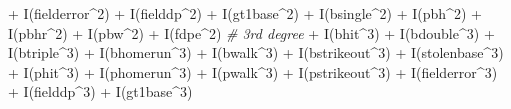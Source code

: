\documentclass[
]{article}
\newenvironment{Shaded}{\begin{snugshade}}{\end{snugshade}}
\newcommand{\CommentTok}[1]{\textcolor[rgb]{0.56,0.35,0.01}{\textit{#1}}}
\newcommand{\DecValTok}[1]{\textcolor[rgb]{0.00,0.00,0.81}{#1}}
\newcommand{\FunctionTok}[1]{\textcolor[rgb]{0.00,0.00,0.00}{#1}}
\newcommand{\NormalTok}[1]{#1}
\newcommand{\SpecialCharTok}[1]{\textcolor[rgb]{0.00,0.00,0.00}{#1}}
\begin{document}
\begin{Shaded}
\begin{Highlighting}[]
               \SpecialCharTok{+} \FunctionTok{I}\NormalTok{(fielderror}\SpecialCharTok{\^{}}\DecValTok{2}\NormalTok{) }
               \SpecialCharTok{+} \FunctionTok{I}\NormalTok{(fielddp}\SpecialCharTok{\^{}}\DecValTok{2}\NormalTok{) }
               \SpecialCharTok{+} \FunctionTok{I}\NormalTok{(gt1base}\SpecialCharTok{\^{}}\DecValTok{2}\NormalTok{) }
               \SpecialCharTok{+} \FunctionTok{I}\NormalTok{(bsingle}\SpecialCharTok{\^{}}\DecValTok{2}\NormalTok{) }
               \SpecialCharTok{+} \FunctionTok{I}\NormalTok{(pbh}\SpecialCharTok{\^{}}\DecValTok{2}\NormalTok{) }
               \SpecialCharTok{+} \FunctionTok{I}\NormalTok{(pbhr}\SpecialCharTok{\^{}}\DecValTok{2}\NormalTok{) }
               \SpecialCharTok{+} \FunctionTok{I}\NormalTok{(pbw}\SpecialCharTok{\^{}}\DecValTok{2}\NormalTok{) }
               \SpecialCharTok{+} \FunctionTok{I}\NormalTok{(fdpe}\SpecialCharTok{\^{}}\DecValTok{2}\NormalTok{) }
               \CommentTok{\# 3rd degree}
               \SpecialCharTok{+} \FunctionTok{I}\NormalTok{(bhit}\SpecialCharTok{\^{}}\DecValTok{3}\NormalTok{)}
               \SpecialCharTok{+} \FunctionTok{I}\NormalTok{(bdouble}\SpecialCharTok{\^{}}\DecValTok{3}\NormalTok{) }
               \SpecialCharTok{+} \FunctionTok{I}\NormalTok{(btriple}\SpecialCharTok{\^{}}\DecValTok{3}\NormalTok{) }
               \SpecialCharTok{+} \FunctionTok{I}\NormalTok{(bhomerun}\SpecialCharTok{\^{}}\DecValTok{3}\NormalTok{) }
               \SpecialCharTok{+} \FunctionTok{I}\NormalTok{(bwalk}\SpecialCharTok{\^{}}\DecValTok{3}\NormalTok{) }
               \SpecialCharTok{+} \FunctionTok{I}\NormalTok{(bstrikeout}\SpecialCharTok{\^{}}\DecValTok{3}\NormalTok{) }
               \SpecialCharTok{+} \FunctionTok{I}\NormalTok{(stolenbase}\SpecialCharTok{\^{}}\DecValTok{3}\NormalTok{) }
               \SpecialCharTok{+} \FunctionTok{I}\NormalTok{(phit}\SpecialCharTok{\^{}}\DecValTok{3}\NormalTok{) }
               \SpecialCharTok{+} \FunctionTok{I}\NormalTok{(phomerun}\SpecialCharTok{\^{}}\DecValTok{3}\NormalTok{) }
               \SpecialCharTok{+} \FunctionTok{I}\NormalTok{(pwalk}\SpecialCharTok{\^{}}\DecValTok{3}\NormalTok{) }
               \SpecialCharTok{+} \FunctionTok{I}\NormalTok{(pstrikeout}\SpecialCharTok{\^{}}\DecValTok{3}\NormalTok{) }
               \SpecialCharTok{+} \FunctionTok{I}\NormalTok{(fielderror}\SpecialCharTok{\^{}}\DecValTok{3}\NormalTok{) }
               \SpecialCharTok{+} \FunctionTok{I}\NormalTok{(fielddp}\SpecialCharTok{\^{}}\DecValTok{3}\NormalTok{) }
               \SpecialCharTok{+} \FunctionTok{I}\NormalTok{(gt1base}\SpecialCharTok{\^{}}\DecValTok{3}\NormalTok{) }

\end{Highlighting}
\end{Shaded}
\end{document}
